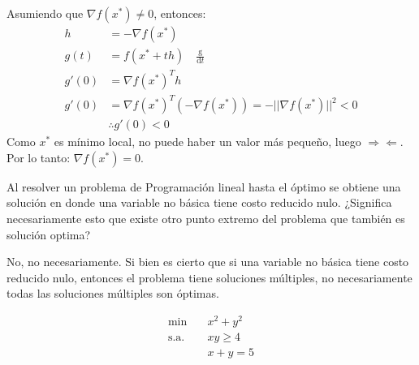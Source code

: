 \documentclass{article}
\newenvironment{question}
{\begin{mdframed}[backgroundcolor=white]}
{\end{mdframed}}
\newenvironment{solution}
{\begin{mdframed}[backgroundcolor=lightorange,hidealllines=true]}
{\end{mdframed}}
\begin{document}
\begin{solution}
    Asumiendo que $\nabla f(x^*)\neq 0$, entonces:
    \begin{align*}
        h     & =-\nabla f(x^*)                                             \\
        g(t)  & =f(x^* + th) \quad \frac{\mathrm{g}}{\mathrm{d}t}           \\
        g'(0) & =\nabla f(x^*)^T h                                          \\
        g'(0) & =\nabla f(x^*)^T (-\nabla f(x^*))= -||\nabla f(x^*)||^2 < 0 \\
              & \therefore g'(0) < 0
    \end{align*}
    Como $x^*$ es mínimo local, no puede haber un valor más pequeño, luego $\Rightarrow \! \Leftarrow$. Por lo tanto: $\nabla f(x^*)=0$.
\end{solution}

\begin{question}
    Al resolver un problema de Programación lineal hasta el óptimo se obtiene una solución en donde una variable no básica tiene costo reducido nulo. ¿Significa necesariamente esto que existe otro punto extremo del problema que también es solución optima?
\end{question}

\begin{solution}
    No, no necesariamente. Si bien es cierto que si una variable no básica tiene costo reducido nulo, entonces el problema tiene soluciones múltiples, no necesariamente todas las soluciones múltiples son óptimas.
\end{solution}

\begin{question}
    \begin{align*}
        \min \quad        & x^2+y^2  \\
        \text{s.a.} \quad & xy\geq 4 \\
                          & x+y=5
    \end{align*}
\end{question}
\end{document}

